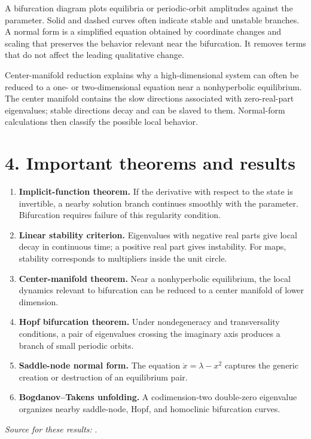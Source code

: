 A bifurcation diagram plots equilibria or periodic-orbit amplitudes against the parameter. Solid and dashed curves often indicate stable and unstable branches. A normal form is a simplified equation obtained by coordinate changes and scaling that preserves the behavior relevant near the bifurcation. It removes terms that do not affect the leading qualitative change.

Center-manifold reduction explains why a high-dimensional system can often be reduced to a one- or two-dimensional equation near a nonhyperbolic equilibrium. The center manifold contains the slow directions associated with zero-real-part eigenvalues; stable directions decay and can be slaved to them. Normal-form calculations then classify the possible local behavior.

\section*{4. Important theorems and results}
\begin{enumerate}[leftmargin=*,itemsep=0.35em]

\item \textbf{Implicit-function theorem.} If the derivative with respect to the state is invertible, a nearby solution branch continues smoothly with the parameter. Bifurcation requires failure of this regularity condition.

\item \textbf{Linear stability criterion.} Eigenvalues with negative real parts give local decay in continuous time; a positive real part gives instability. For maps, stability corresponds to multipliers inside the unit circle.

\item \textbf{Center-manifold theorem.} Near a nonhyperbolic equilibrium, the local dynamics relevant to bifurcation can be reduced to a center manifold of lower dimension.

\item \textbf{Hopf bifurcation theorem.} Under nondegeneracy and transversality conditions, a pair of eigenvalues crossing the imaginary axis produces a branch of small periodic orbits.

\item \textbf{Saddle-node normal form.} The equation $\dot x=\lambda-x^2$ captures the generic creation or destruction of an equilibrium pair.

\item \textbf{Bogdanov--Takens unfolding.} A codimension-two double-zero eigenvalue organizes nearby saddle-node, Hopf, and homoclinic bifurcation curves.
\end{enumerate}
\noindent\emph{Source for these results:} \cite{bifurcation_theory_ref1}.

